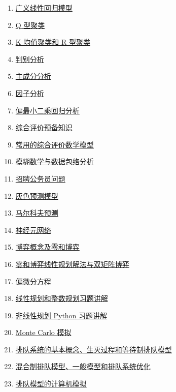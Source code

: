 \documentclass[11pt]{article}
\begin{document}
\begin{multicols}{2}
\begin{enumerate}
		\item \href{https://mp.weixin.qq.com/s/wR0t2xg3YlZVmdmGS6RQiQ}{广义线性回归模型}	%
		\item \href{https://mp.weixin.qq.com/s/2xvhRNoxH_aEghhXLxYVZQ}{Q 型聚类}	%
		\item \href{https://mp.weixin.qq.com/s/_AMsWc6IeiE8NW55SoVViA}{K 均值聚类和 R 型聚类}	%
		\item \href{https://mp.weixin.qq.com/s/KjlzmtWY3OzfO9L1dTmAxQ}{判别分析}	%
		\item \href{https://mp.weixin.qq.com/s/0X1phLEk9jRwtcs1zss3sw}{主成分分析}	%
		\item \href{https://mp.weixin.qq.com/s/XTK0MSAuTt9Tn-nMzbV0TA}{因子分析}	%
		\item \href{https://mp.weixin.qq.com/s/t3pKnL_7ROpK5pA0viiQBg}{偏最小二乘回归分析}	%
		\item \href{https://mp.weixin.qq.com/s/zO_Wi9SRdQSZGnO4ztpPAQ}{综合评价预备知识}	%
		\item \href{https://mp.weixin.qq.com/s/601FRTDpi9473eSRPkCGDg}{常用的综合评价数学模型}	%
		\item \href{https://mp.weixin.qq.com/s/-m22NhsmV8j-LPwpqgEDhA}{模糊数学与数据包络分析}	%
		\item \href{https://mp.weixin.qq.com/s/LxNdfBXukpW3eJiRUlokfQ}{招聘公务员问题}	%
		\item \href{https://mp.weixin.qq.com/s/OsWs2HSoK9tC4t2roVR2UQ}{灰色预测模型}	%
		\item \href{https://mp.weixin.qq.com/s/hmuuJIvhzHkoRogSyyBUZg}{马尔科夫预测}	%
		\item \href{https://mp.weixin.qq.com/s/ZEzYao932gPg0AG_zS6Wkg}{神经元网络}	%
		\item \href{https://mp.weixin.qq.com/s/CO5eMHe9N2rL6EMjl-zujw}{博弈概念及零和博弈}	%
		\item \href{https://mp.weixin.qq.com/s/ijhNjdwWzO4N942Iv6V8Sg}{零和博弈线性规划解法与双矩阵博弈}	%
		\item \href{https://mp.weixin.qq.com/s/xvLQespNyffgDBtJqSI2Vg}{偏微分方程}	%
		\item \href{https://mp.weixin.qq.com/s/8PsNYvwq-tM2NCfrZTybmQ}{线性规划和整数规划习题讲解}	%
		\item \href{https://mp.weixin.qq.com/s/4zmX1DKuk9q4yvkiKpK1oA}{非线性规划 Python 习题讲解}	%
		\item \href{https://mp.weixin.qq.com/s/K4kmc2Sg6fRMmReATklTUA}{Monte Carlo 模拟}	%
		\item \href{https://mp.weixin.qq.com/s/0Ig0CVMJD0oLNUjIZJ6ebA}{排队系统的基本概念、生灭过程和等待制排队模型}	%
		\item \href{https://mp.weixin.qq.com/s/X8-Nhih28PWtkbqTH5R2GQ}{混合制排队模型、一般模型和排队系统优化}	%
		\item \href{https://mp.weixin.qq.com/s/5Blgbz7tCHWGHhNJ0M32LQ}{排队模型的计算机模拟}	%
	\end{enumerate}
\end{multicols}
\end{document}
